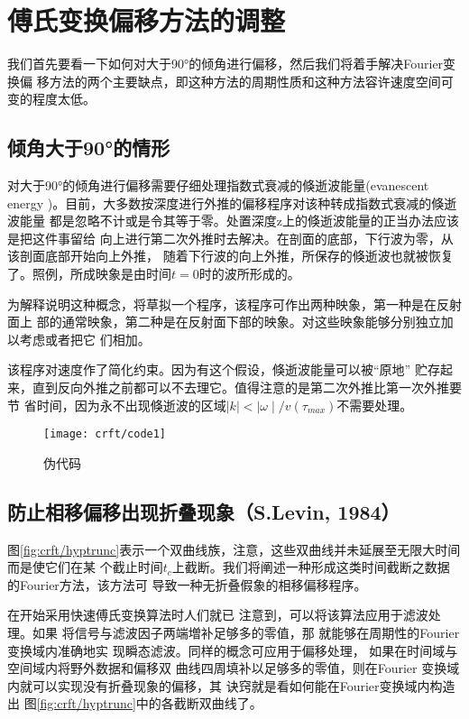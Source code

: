 \section{傅氏变换偏移方法的调整}
\label{sec:4.5}

我们首先要看一下如何对大于90°的倾角进行偏移，然后我们将着手解决Fourier变换偏
移方法的两个主要缺点，即这种方法的周期性质和这种方法容许速度空间可变的程度太低。

\subsection{倾角大于90°的情形}
\label{sec:4.5.1}

对大于90°的倾角进行偏移需要仔细处理指数式衰减的倏逝波能量(evanescent
energy
)。目前，大多数按深度进行外推的偏移程序对该种转成指数式衰减的倏逝波能量
都是忽略不计或是令其等于零。处置深度z上的倏逝波能量的正当办法应该是把这件事留给
向上进行第二次外推时去解决。在剖面的底部，下行波为零，从该剖面底部开始向上外推，
随着下行波的向上外推，所保存的倏逝波也就被恢复了。照例，所成映象是由时间$t
=0$时的波所形成的。

为解释说明这种概念，将草拟一个程序，该程序可作出两种映象，第一种是在反射面上
部的通常映象，第二种是在反射面下部的映象。对这些映象能够分别独立加以考虑或者把它
们相加。

该程序对速度作了简化约束。因为有这个假设，倏逝波能量可以被“原地”
贮存起来，直到反向外推之前都可以不去理它。值得注意的是第二次外推比第一次外推要节
省时间，因为永不出现倏逝波的区域$\mid k\mid<\mid \omega\mid/v(\tau_{max})$不需要处理。

\begin{figure}[H]
\centering
\texttt{[image: crft/code1]}
\caption[code1]{伪代码}
\label{fig:crft/code1}
\end{figure}

\subsection{防止相移偏移出现折叠现象（S.Levin, 1984） }
\label{sec:4.5.2}

图\ref{fig:crft/hyptrunc}表示一个双曲线族，注意，这些双曲线并未延展至无限大时间而是使它们在某
个截止时间$t_c$上截断。我们将阐述一种形成这类时间截断之数据的Fourier方法，该方法可
导致一种无折叠假象的相移偏移程序。

在开始采用快速傅氏变换算法时人们就已
注意到，可以将该算法应用于滤波处理。如果
将信号与滤波因子两端増补足够多的零值，那
就能够在周期性的Fourier变换域内准确地实
现瞬态滤波。同样的概念可应用于偏移处理，
如果在时间域与空间域内将野外数据和偏移双
曲线四周填补以足够多的零值，则在Fourier
变换域内就可以实现没有折叠现象的偏移，其
诀窍就是看如何能在Fourier变换域内构造出
图\ref{fig:crft/hyptrunc}中的各截断双曲线了。

